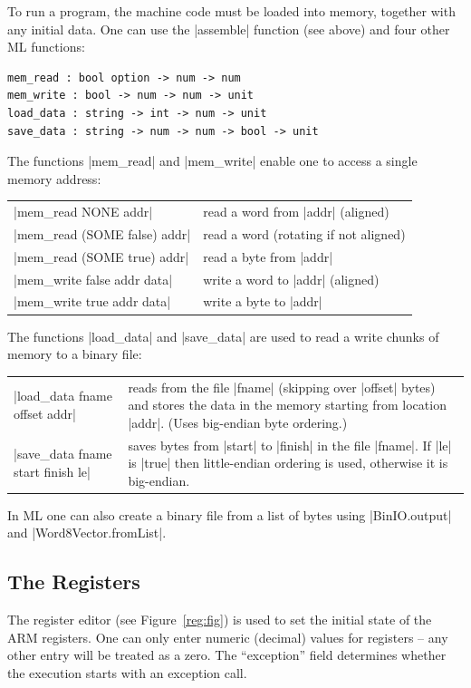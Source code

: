 \documentclass[12pt]{article}
\newcommand{\F}{Figure~}
\begin{document}
To run a program, the machine code must be loaded into memory, together with any initial data.  One can use the |assemble| function (see above) and four other ML functions:
\begin{Verbatim}
mem_read : bool option -> num -> num
mem_write : bool -> num -> num -> unit
load_data : string -> int -> num -> unit
save_data : string -> num -> num -> bool -> unit
\end{Verbatim}
The functions |mem_read| and |mem_write| enable one to access a single memory address:
\begin{center}
  \begin{tabular}{@{} ll @{}}
    |mem_read NONE addr| & read a word from |addr| (aligned) \\ 
    |mem_read (SOME false) addr| & read a word  (rotating if not aligned) \\ 
    |mem_read (SOME true) addr| & read a byte from |addr| \\[4pt]
    |mem_write false addr data| & write a word to |addr| (aligned) \\ 
    |mem_write true addr data| & write a byte to |addr| \\
  \end{tabular}
\end{center}
The functions |load_data| and |save_data| are used to read a write chunks of memory to a binary file:
\begin{center}
  \begin{tabular}{@{} lp{70mm} @{}}
    |load_data fname offset addr| & reads from the file |fname| (skipping over |offset| bytes) and stores the data in the memory starting from location |addr|.  (Uses big-endian byte ordering.) \\[4pt]
    |save_data fname start finish le| & saves bytes from |start| to |finish| in the file |fname|.  If |le| is |true| then little-endian ordering is used, otherwise it is big-endian.  \\
  \end{tabular}
\end{center}
In ML one can also create a binary file from a list of bytes using |BinIO.output| and |Word8Vector.fromList|.

\subsection*{The Registers}

The register editor (see \F\ref{reg:fig}) is used to set the initial state of the ARM registers.  One can only enter numeric (decimal) values for registers -- any other entry will be treated as a zero.  The ``exception'' field determines whether the execution starts with an exception call.
\end{document}

